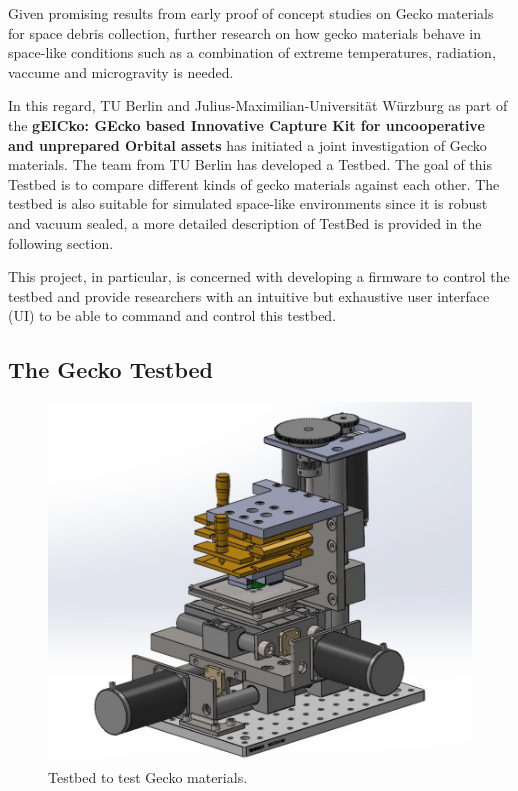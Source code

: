 \documentclass[
    twocolumn,
    fontsize = 10pt,
    parskip = half+,
    headings = small,
    headwidth = text,
    footwidth = text,
]{scrartcl}
\begin{document}
Given promising results from early proof of concept studies on Gecko materials for space debris collection, further research on how gecko materials behave in space-like conditions such as a combination of extreme temperatures, radiation, vaccume and microgravity is needed. 

In this regard, TU Berlin and Julius-Maximilian-Universität Würzburg as part of the \textbf{gEICko: GEcko based Innovative Capture Kit for uncooperative and unprepared Orbital assets} has initiated a joint investigation of Gecko materials. The team from TU Berlin has developed a Testbed. The goal of this Testbed is to compare different kinds of gecko materials against each other. The testbed is also suitable for simulated space-like environments since it is robust and vacuum sealed, a more detailed description of TestBed is provided in the following section.

This project, in particular, is concerned with developing a firmware to control the testbed and provide researchers with an intuitive but exhaustive user interface (UI) to be able to command and control this testbed.

\subsection{The Gecko Testbed}

\begin{figure}[h]
    \centering
    \includegraphics[width=1.0\linewidth]{pics/gecko_testbed.png}
    \caption{Testbed to test Gecko materials.}
    \label{fig: gecko testbed}
\end{figure}
\end{document}

